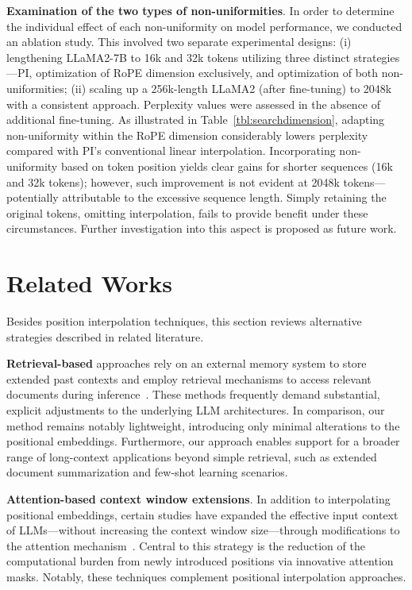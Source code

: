 \textbf{Examination of the two types of non-uniformities}. In order to determine the individual effect of each non-uniformity on model performance, we conducted an ablation study. This involved two separate experimental designs: (i) lengthening LLaMA2-7B to 16k and 32k tokens utilizing three distinct strategies—PI, optimization of RoPE dimension exclusively, and optimization of both non-uniformities; (ii) scaling up a 256k-length LLaMA2 (after fine-tuning) to 2048k with a consistent approach. Perplexity values were assessed in the absence of additional fine-tuning. As illustrated in Table~\ref{tbl:searchdimension}, adapting non-uniformity within the RoPE dimension considerably lowers perplexity compared with PI's conventional linear interpolation. Incorporating non-uniformity based on token position yields clear gains for shorter sequences (16k and 32k tokens); however, such improvement is not evident at 2048k tokens—potentially attributable to the excessive sequence length. Simply retaining the original tokens, omitting interpolation, fails to provide benefit under these circumstances. Further investigation into this aspect is proposed as future work.

\section{Related Works}

Besides position interpolation techniques, this section reviews alternative strategies described in related literature.

\textbf{Retrieval-based} approaches rely on an external memory system to store extended past contexts and employ retrieval mechanisms to access relevant documents during inference~\cite{longllama,wang2023augmenting,borgeaud2022improving}. These methods frequently demand substantial, explicit adjustments to the underlying LLM architectures. In comparison, our method remains notably lightweight, introducing only minimal alterations to the positional embeddings. Furthermore, our approach enables support for a broader range of long-context applications beyond simple retrieval, such as extended document summarization and few-shot learning scenarios.

\textbf{Attention-based context window extensions}. In addition to interpolating positional embeddings, certain studies have expanded the effective input context of LLMs—without increasing the context window size—through modifications to the attention mechanism~\cite{han2023lminfinite, streamingllm,parallelwindow}. Central to this strategy is the reduction of the computational burden from newly introduced positions via innovative attention masks. Notably, these techniques complement positional interpolation approaches.

